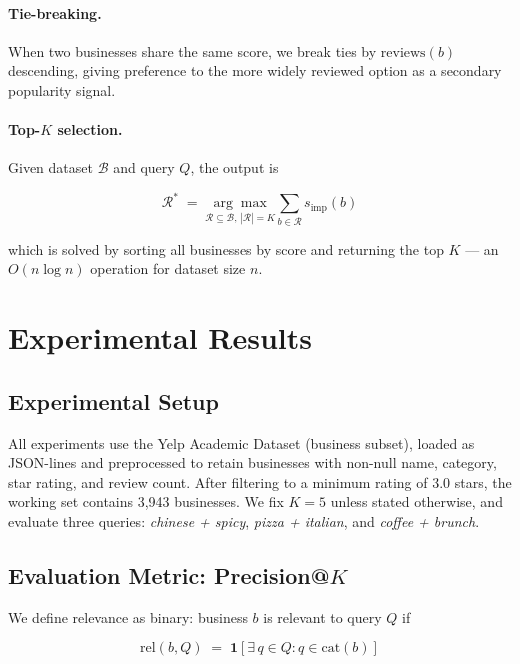 \paragraph{Tie-breaking.}
When two businesses share the same score, we break ties by
$\text{reviews}(b)$ descending, giving preference to the more
widely reviewed option as a secondary popularity signal.

\paragraph{Top-$K$ selection.}
Given dataset $\mathcal{B}$ and query $Q$, the output is

\begin{equation}
  \mathcal{R}^* \;=\;
    \underset{\mathcal{R} \subseteq \mathcal{B},\,|\mathcal{R}|=K}{\arg\max}
    \sum_{b \in \mathcal{R}} s_{\text{imp}}(b)
\end{equation}

\noindent which is solved by sorting all businesses by score and
returning the top $K$ — an $O(n \log n)$ operation for dataset size $n$.


\section{Experimental Results}

\subsection{Experimental Setup}

All experiments use the Yelp Academic Dataset (business subset),
loaded as JSON-lines and preprocessed to retain businesses with
non-null name, category, star rating, and review count.
After filtering to a minimum rating of 3.0 stars, the working set
contains 3,943 businesses.
We fix $K = 5$ unless stated otherwise, and evaluate three queries:
\textit{chinese + spicy}, \textit{pizza + italian},
and \textit{coffee + brunch}.

\subsection{Evaluation Metric: Precision@$K$}

We define relevance as binary: business $b$ is relevant to query $Q$ if

\begin{equation}
  \text{rel}(b, Q) \;=\; \mathbf{1}\!\left[\exists\, q \in Q : q \in \text{cat}(b)\right]
\end{equation}

